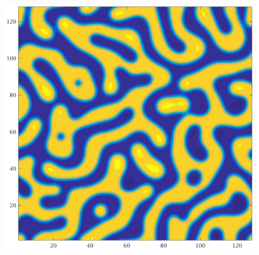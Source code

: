\documentclass[a4paper,6pt]{article}
\begin{document}
\begin{figure}[H]
\begin{minipage}[b]{.32\linewidth}
        \end{minipage}
                \begin{minipage}[b]{.32\linewidth}
                \centering
                \includegraphics[width=1\textwidth]{pics/C2_t3.jpg}
        \end{minipage}
        

\end{figure}
\end{document}
